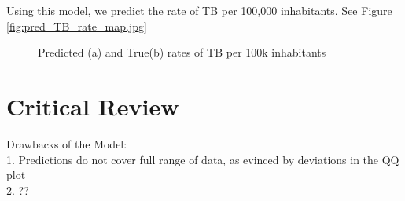 \documentclass{article}
\begin{document}
Using this model, we predict the rate of TB per 100,000 inhabitants. See Figure \ref{fig:pred_TB_rate_map.jpg}

\begin{figure}[H]
    \centering
    \qquad
    \caption{Predicted (a) and True(b) rates of TB per 100k inhabitants}%
    \label{fig:example}%
\end{figure}

\section{Critical Review}
Drawbacks of the Model:
\\
1. Predictions do not cover full range of data, as evinced by deviations in the QQ plot
\\
2. ??
\end{document}
